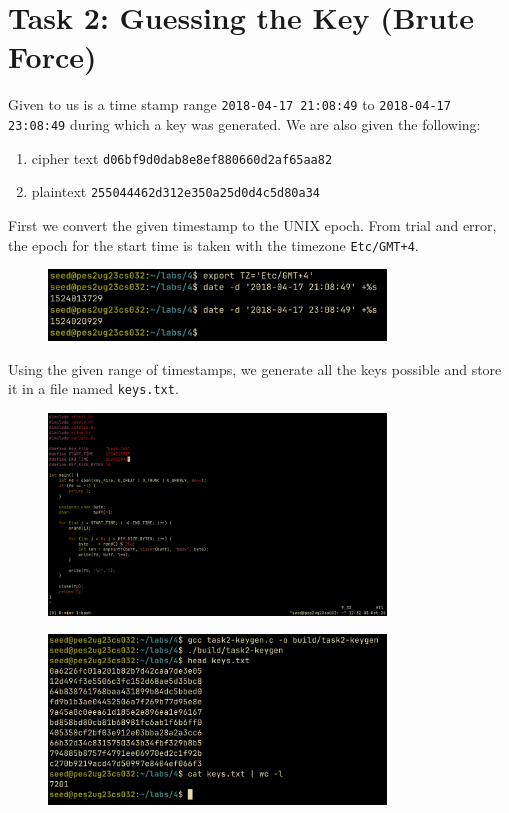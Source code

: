 \documentclass[12pt,a4paper]{article}
\begin{document}
\section{Task 2: Guessing the Key (Brute Force)}

Given to us is a time stamp range \texttt{2018\@-04\@-17 21:08:49} to \texttt{2018\@-04\@-17 23:08:49} during which a key was generated. We are also given the following:

\begin{enumerate}
    \item cipher text \texttt{d06bf9d0dab8e8ef880660d2af65aa82}
    \item plaintext \texttt{255044462d312e350a25d0d4c5d80a34}
\end{enumerate}

First we convert the given timestamp to the UNIX epoch. From trial and error, the epoch for the start time is taken with the timezone \texttt{Etc/GMT+4}.

\begin{figure}[H]
    \centering
    \includegraphics[width=0.8\textwidth]{./images/task2-1.png} 
\end{figure}

Using the given range of timestamps, we generate all the keys possible and store it in a file named \texttt{keys.txt}.

\begin{figure}[H]
    \centering
    \includegraphics[width=0.8\textwidth]{./images/task2-2.png} 
\end{figure}

\begin{figure}[H]
    \centering
    \includegraphics[width=0.8\textwidth]{./images/task2-3.png} 
\end{figure}
\end{document}
